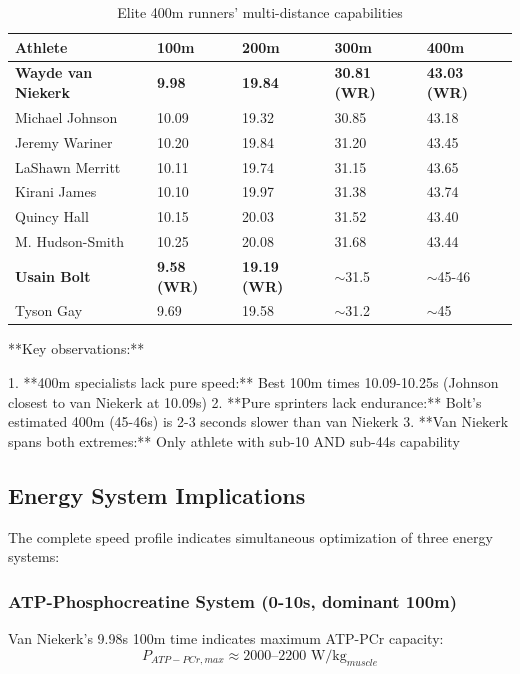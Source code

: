\begin{table}[H]
\centering
\caption{Elite 400m runners' multi-distance capabilities}
\begin{tabular}{@{}lllll@{}}
\toprule
\textbf{Athlete} & \textbf{100m} & \textbf{200m} & \textbf{300m} & \textbf{400m} \\
\midrule
\textbf{Wayde van Niekerk} & \textbf{9.98} & \textbf{19.84} & \textbf{30.81 (WR)} & \textbf{43.03 (WR)} \\
Michael Johnson & 10.09 & 19.32 & 30.85 & 43.18 \\
Jeremy Wariner & 10.20 & 19.84 & 31.20 & 43.45 \\
LaShawn Merritt & 10.11 & 19.74 & 31.15 & 43.65 \\
Kirani James & 10.10 & 19.97 & 31.38 & 43.74 \\
Quincy Hall & 10.15 & 20.03 & 31.52 & 43.40 \\
M. Hudson-Smith & 10.25 & 20.08 & 31.68 & 43.44 \\
\midrule
\textbf{Usain Bolt} & \textbf{9.58 (WR)} & \textbf{19.19 (WR)} & $\sim$31.5 & $\sim$45-46 \\
Tyson Gay & 9.69 & 19.58 & $\sim$31.2 & $\sim$45 \\
\bottomrule
\end{tabular}
\end{table}

**Key observations:**

1. **400m specialists lack pure speed:** Best 100m times 10.09-10.25s (Johnson closest to van Niekerk at 10.09s)
2. **Pure sprinters lack endurance:** Bolt's estimated 400m (45-46s) is 2-3 seconds slower than van Niekerk
3. **Van Niekerk spans both extremes:** Only athlete with sub-10 AND sub-44s capability

\subsection{Energy System Implications}

The complete speed profile indicates simultaneous optimization of three energy systems:

\subsubsection{ATP-Phosphocreatine System (0-10s, dominant 100m)}

Van Niekerk's 9.98s 100m time indicates maximum ATP-PCr capacity:
\begin{equation}
P_{ATP-PCr,max} \approx 2000\text{--}2200 \text{ W/kg}_{muscle}
\end{equation}

